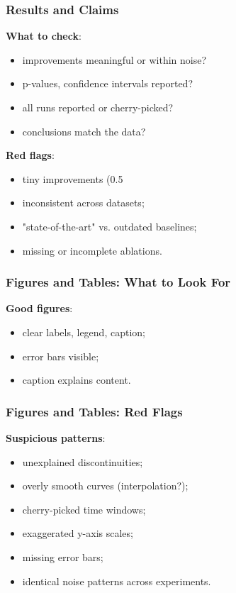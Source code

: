 \documentclass[]{beamer}
\begin{document}
\begin{frame}[fragile]
\frametitle{Results and Claims}
\textbf{What to check}:
\begin{itemize}
  \item improvements meaningful or within noise?
  \item p-values, confidence intervals reported?
  \item all runs reported or cherry-picked?
  \item conclusions match the data?
\end{itemize}

\textbf{Red flags}:
\begin{itemize}
  \item tiny improvements (0.5%
  \item inconsistent across datasets;
  \item "state-of-the-art" vs. outdated baselines;
  \item missing or incomplete ablations.
\end{itemize}

\end{frame}

\begin{frame}[fragile]
\frametitle{Figures and Tables: What to Look For}
\textbf{Good figures}:
\begin{itemize}
  \item clear labels, legend, caption;
  \item error bars visible;
  \item caption explains content.
\end{itemize}

\end{frame}

\begin{frame}[fragile]
\frametitle{Figures and Tables: Red Flags}
\textbf{Suspicious patterns}:
\begin{itemize}
  \item unexplained discontinuities;
  \item overly smooth curves (interpolation?);
  \item cherry-picked time windows;
  \item exaggerated y-axis scales;
  \item missing error bars;
  \item identical noise patterns across experiments.
\end{itemize}

\end{frame}
\end{document}
